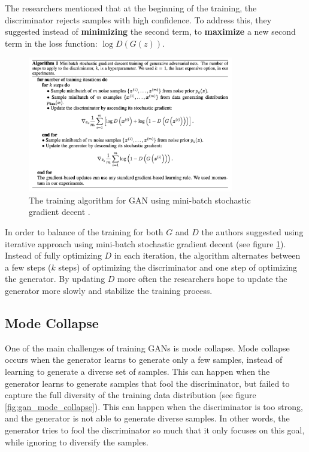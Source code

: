 The researchers mentioned that at the beginning of the training, the discriminator rejects samples with high confidence. To address this, they suggested instead of \textbf{minimizing} the second term, to \textbf{maximize} a new second term in the loss function: $\log D(G(z))$.


\begin{figure}
    \centering
    \includegraphics[width=0.8\textwidth]{images/gan/gan_training.png}
    \caption{The training algorithm for GAN using mini-batch stochastic gradient decent \cite{gan}.}
    \label{fig:gan_training}
\end{figure}

In order to balance of the training for both $G$ and $D$ the authors suggested using iterative approach using mini-batch stochastic gradient decent (see figure \ref{fig:gan_training}). Instead of fully optimizing $D$ in each iteration, the algorithm alternates between a few steps ($k$ steps) of optimizing the discriminator and one step of optimizing the generator. By updating $D$ more often the researchers hope to update the generator more slowly and stabilize the training process.



\subsection{Mode Collapse}
\label{gan_mode_collapse}

One of the main challenges of training GANs is mode collapse. Mode collapse occurs when the generator learns to generate only a few samples, instead of learning to generate a diverse set of samples. This can happen when the generator learns to generate samples that fool the discriminator, but failed to capture the full diversity of the training data distribution (see figure \ref{fig:gan_mode_collapse}). This can happen when the discriminator is too strong, and the generator is not able to generate diverse samples. In other words, the generator tries to fool the discriminator so much that it only focuses on this goal, while ignoring to diversify the samples.

